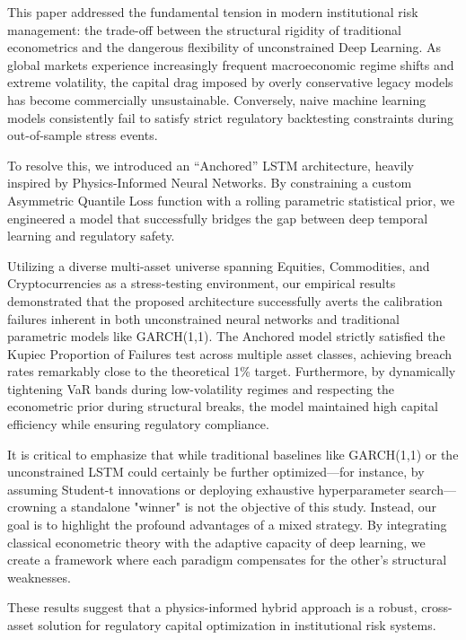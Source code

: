 
This paper addressed the fundamental tension in modern institutional risk management: the trade-off between the structural rigidity of traditional econometrics and the dangerous flexibility of unconstrained Deep Learning. As global markets experience increasingly frequent macroeconomic regime shifts and extreme volatility, the capital drag imposed by overly conservative legacy models has become commercially unsustainable. Conversely, naive machine learning models consistently fail to satisfy strict regulatory backtesting constraints during out-of-sample stress events.

To resolve this, we introduced an ``Anchored'' LSTM architecture, heavily inspired by Physics-Informed Neural Networks. By constraining a custom Asymmetric Quantile Loss function with a rolling parametric statistical prior, we engineered a model that successfully bridges the gap between deep temporal learning and regulatory safety.

Utilizing a diverse multi-asset universe spanning Equities, Commodities, and Cryptocurrencies as a stress-testing environment, our empirical results demonstrated that the proposed architecture successfully averts the calibration failures inherent in both unconstrained neural networks and traditional parametric models like GARCH(1,1). The Anchored model strictly satisfied the Kupiec Proportion of Failures test across multiple asset classes, achieving breach rates remarkably close to the theoretical 1\% target. Furthermore, by dynamically tightening VaR bands during low-volatility regimes and respecting the econometric prior during structural breaks, the model maintained high capital efficiency while ensuring regulatory compliance.

It is critical to emphasize that while traditional baselines like GARCH(1,1) or the unconstrained LSTM could certainly be further optimized---for instance, by assuming Student-t innovations or deploying exhaustive hyperparameter search---crowning a standalone "winner" is not the objective of this study. Instead, our goal is to highlight the profound advantages of a mixed strategy. By integrating classical econometric theory with the adaptive capacity of deep learning, we create a framework where each paradigm compensates for the other's structural weaknesses.

These results suggest that a physics-informed hybrid approach is a robust, cross-asset solution for regulatory capital optimization in institutional risk systems.

